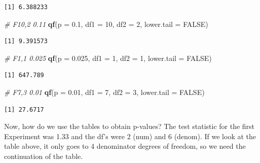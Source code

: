 \documentclass[
  letterpaper,
]{book}
\newenvironment{Shaded}{\begin{snugshade}}{\end{snugshade}}
\newcommand{\AttributeTok}[1]{\textcolor[rgb]{0.13,0.29,0.53}{#1}}
\newcommand{\CommentTok}[1]{\textcolor[rgb]{0.56,0.35,0.01}{\textit{#1}}}
\newcommand{\ConstantTok}[1]{\textcolor[rgb]{0.56,0.35,0.01}{#1}}
\newcommand{\DecValTok}[1]{\textcolor[rgb]{0.00,0.00,0.81}{#1}}
\newcommand{\FloatTok}[1]{\textcolor[rgb]{0.00,0.00,0.81}{#1}}
\newcommand{\FunctionTok}[1]{\textcolor[rgb]{0.13,0.29,0.53}{\textbf{#1}}}
\newcommand{\NormalTok}[1]{#1}
\begin{document}
\begin{verbatim}
[1] 6.388233
\end{verbatim}

\begin{Shaded}
\begin{Highlighting}[]
\CommentTok{\# F10,2 0.11}
\FunctionTok{qf}\NormalTok{(}\AttributeTok{p =} \FloatTok{0.1}\NormalTok{,   }\AttributeTok{df1 =} \DecValTok{10}\NormalTok{, }\AttributeTok{df2 =} \DecValTok{2}\NormalTok{, }\AttributeTok{lower.tail =} \ConstantTok{FALSE}\NormalTok{)}
\end{Highlighting}
\end{Shaded}

\begin{verbatim}
[1] 9.391573
\end{verbatim}

\begin{Shaded}
\begin{Highlighting}[]
\CommentTok{\# F1,1 0.025}
\FunctionTok{qf}\NormalTok{(}\AttributeTok{p =} \FloatTok{0.025}\NormalTok{, }\AttributeTok{df1 =} \DecValTok{1}\NormalTok{,  }\AttributeTok{df2 =} \DecValTok{1}\NormalTok{, }\AttributeTok{lower.tail =} \ConstantTok{FALSE}\NormalTok{)}
\end{Highlighting}
\end{Shaded}

\begin{verbatim}
[1] 647.789
\end{verbatim}

\begin{Shaded}
\begin{Highlighting}[]
\CommentTok{\# F7,3 0.01}
\FunctionTok{qf}\NormalTok{(}\AttributeTok{p =} \FloatTok{0.01}\NormalTok{,  }\AttributeTok{df1 =} \DecValTok{7}\NormalTok{,  }\AttributeTok{df2 =} \DecValTok{3}\NormalTok{, }\AttributeTok{lower.tail =} \ConstantTok{FALSE}\NormalTok{)}
\end{Highlighting}
\end{Shaded}

\begin{verbatim}
[1] 27.6717
\end{verbatim}

Now, how do we use the tables to obtain p-values? The test statistic for
the first Experiment was 1.33 and the df's were 2 (num) and 6 (denom).
If we look at the table above, it only goes to 4 denominator degrees of
freedom, so we need the continuation of the table.
\end{document}
